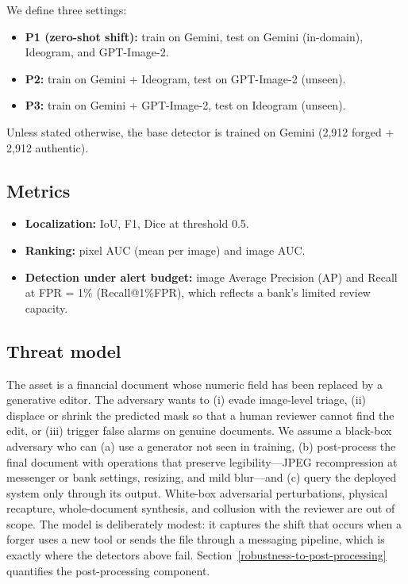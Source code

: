 \documentclass[preprint,12pt]{elsarticle}
\providecommand{\tightlist}{} %
\begin{document}
We define three settings:

\begin{itemize}
\tightlist
\item
  \textbf{P1 (zero-shot shift):} train on Gemini, test on Gemini (in-domain), Ideogram, and GPT-Image-2.
\item
  \textbf{P2:} train on Gemini + Ideogram, test on GPT-Image-2 (unseen).
\item
  \textbf{P3:} train on Gemini + GPT-Image-2, test on Ideogram (unseen).
\end{itemize}

Unless stated otherwise, the base detector is trained on Gemini (2,912 forged + 2,912 authentic).

\subsection{Metrics}\label{metrics}

\begin{itemize}
\tightlist
\item
  \textbf{Localization:} IoU, F1, Dice at threshold 0.5.
\item
  \textbf{Ranking:} pixel AUC (mean per image) and image AUC.
\item
  \textbf{Detection under alert budget:} image Average Precision (AP) and Recall at FPR = 1\% (Recall@1\%FPR), which reflects a bank's limited review capacity.
\end{itemize}

\subsection{Threat model}\label{threat-model}

The asset is a financial document whose numeric field has been replaced by a generative editor. The adversary wants to (i) evade image-level triage, (ii) displace or shrink the predicted mask so that a human reviewer cannot find the edit, or (iii) trigger false alarms on genuine documents. We assume a black-box adversary who can (a) use a generator not seen in training, (b) post-process the final document with operations that preserve legibility---JPEG recompression at messenger or bank settings, resizing, and mild blur---and (c) query the deployed system only through its output. White-box adversarial perturbations, physical recapture, whole-document synthesis, and collusion with the reviewer are out of scope. The model is deliberately modest: it captures the shift that occurs when a forger uses a new tool or sends the file through a messaging pipeline, which is exactly where the detectors above fail. Section~\ref{robustness-to-post-processing} quantifies the post-processing component.
\end{document}
